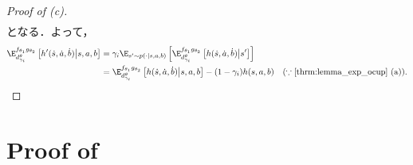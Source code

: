 \documentclass[a4paper,10pt,dvipdfmx]{jsarticle}
\begin{document}
\begin{proof}[Proof of (c)]
\begin{subequations}
\begin{align}
    \end{align}
    \end{subequations}
    となる．よって，
    \begin{subequations}
    \begin{align}
        \E_{d_{\gamma_i}^{\theta}}^{f_{\theta_1}g_{\theta_2}}\left[h'(\dot{s},\dot{a},\dot{b})\middle|s,a,b\right]&=\gamma_i\E_{s'\sim p(\cdot|s,a,b)}\left[\E_{d_{\gamma_i}^{\theta}}^{f_{\theta_1}g_{\theta_2}}\left[h(\dot{s},\dot{a},\dot{b})\middle|s'\right]\right]\\
        &=\E_{d_{\gamma_i}^{\theta}}^{f_{\theta_1}g_{\theta_2}}\left[h(\dot{s},\dot{a},\dot{b})\middle|s,a,b\right]-(1-\gamma_i)h(s,a,b)\quad (\because \mathrm{\Cref{thrm:lemma_exp_ocup}~(a)}).
    \end{align}
    \end{subequations}
\end{proof}


\section{Proof of }\label{sec:proof_SSPG_nabla_21_J_2}
\end{document}
